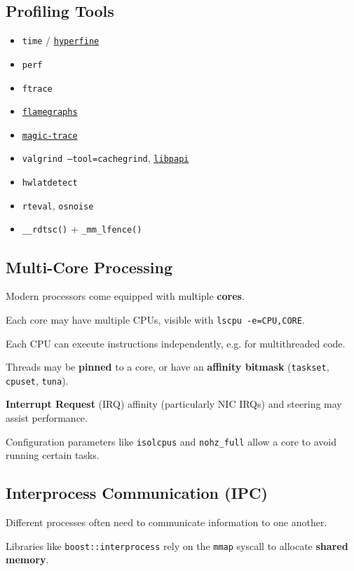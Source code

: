 \documentclass{article}
\begin{document}
\subsection{Profiling Tools}
\begin{itemize}
	\item \texttt{time} / \href{https://github.com/sharkdp/hyperfine}{\texttt{hyperfine}}
	\item \texttt{perf}
	\item \texttt{ftrace}
	\item \href{https://www.brendangregg.com/FlameGraphs/cpu-bash-flamegraph.svg}{\texttt{flamegraphs}}
	\item \href{https://github.com/janestreet/magic-trace}{\texttt{magic-trace}}
	\item \texttt{valgrind --tool=cachegrind}, \href{https://github.com/david-grs/papipp}{\texttt{libpapi}}
	\item \texttt{hwlatdetect}
	\item \texttt{rteval}, \texttt{osnoise}
	\item \texttt{\_\_rdtsc()} + \texttt{\_mm\_lfence()}
\end{itemize}

\subsection{Multi-Core Processing}
Modern processors come equipped with multiple \textbf{cores}.

Each core may have multiple CPUs, visible with \texttt{lscpu -e=CPU,CORE}.

Each CPU can execute instructions independently, e.g. for multithreaded code.

Threads may be \textbf{pinned} to a core, or have an \textbf{affinity bitmask} (\texttt{taskset}, \texttt{cpuset}, \texttt{tuna}).

\textbf{Interrupt Request} (IRQ) affinity (particularly NIC IRQs) and steering may assist performance.

Configuration parameters like \texttt{isolcpus} and \texttt{nohz\_full} allow a core to avoid running certain tasks.

\subsection{Interprocess Communication (IPC)}
Different processes often need to communicate information to one another.

Libraries like \texttt{boost::interprocess} rely on the \texttt{mmap} syscall to allocate \textbf{shared memory}.
\end{document}
